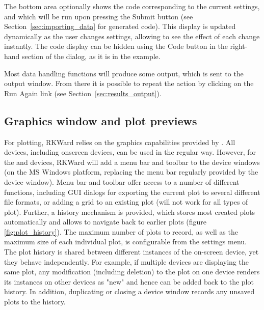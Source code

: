 The bottom area optionally shows the 
code corresponding to the current settings, and which will be run
upon pressing the Submit button (see Section~\ref{sec:importing_data} for generated  code). This
display is updated dynamically as the user changes settings, allowing
to see the effect of each change instantly. The code display can be hidden using
the Code button in the right-hand section of the dialog, as it is in the example.

Most data handling functions will produce some output, which is
sent to the output window. From there it is possible to repeat the
action by clicking on the Run Again link
(see Section~\ref{sec:results_output}).

\subsection{Graphics window and plot previews}
\label{sec:plot_previews}

For plotting, RKWard relies on the graphics capabilities provided by
. All 
devices, including onscreen devices, can be used in the regular way.
However, for the  and  devices, RKWard will add a menu
bar and toolbar to the device windows (on the MS Windows platform,
replacing the menu bar regularly provided by the device window). Menu
bar and toolbar offer access to a number of different functions,
including GUI dialogs for exporting the current plot to several
different file formats, or adding a grid to an existing plot (will not
work for all types of plot). Further, a history mechanism is provided,
which stores most created plots automatically and allows to navigate
back to earlier plots (figure \ref{fig:plot_history}). The maximum number
of plots to record, as well as the maximum size of each individual plot,
is configurable from the settings menu. The plot history is shared
between different instances of the on{}-screen device, yet they behave
independently. For example, if multiple devices are displaying the same
plot, any modification (including deletion) to the plot on one device
renders its instances on other devices as "new" and hence can be added
back to the plot history. In addition, duplicating or closing a device
window records any unsaved plots to the history.

